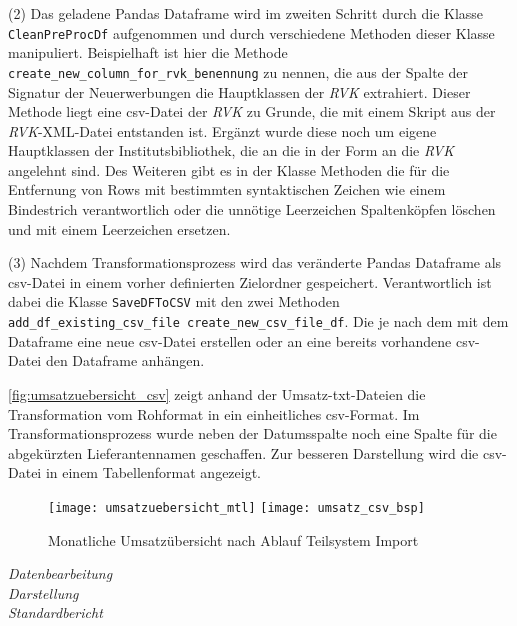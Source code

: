     (2) Das geladene Pandas Dataframe wird im zweiten Schritt durch die Klasse \texttt{CleanPreProcDf} aufgenommen und durch verschiedene Methoden dieser Klasse
    manipuliert. Beispielhaft ist hier die Methode \texttt{create\_new\_column\_for\_rvk\_benennung} zu nennen, die aus der Spalte der Signatur 
    der Neuerwerbungen die Hauptklassen der \textit{\acrlong{RVK}} extrahiert. Dieser Methode liegt eine csv-Datei
    der \textit{\acrshort{RVK}} zu Grunde, die mit einem Skript aus der \textit{\acrshort{RVK}}-XML-Datei entstanden ist. Ergänzt wurde diese noch um eigene Hauptklassen 
    der Institutsbibliothek, die an die in der Form an die \textit{\acrshort{RVK}} angelehnt sind. Des Weiteren gibt es in der Klasse Methoden die für die Entfernung von Rows
    mit bestimmten syntaktischen Zeichen wie einem Bindestrich verantwortlich oder die unnötige Leerzeichen Spaltenköpfen löschen und mit einem Leerzeichen ersetzen.
     
    (3) Nachdem Transformationsprozess wird das veränderte Pandas Dataframe als csv-Datei in einem vorher definierten Zielordner gespeichert. 
    Verantwortlich ist dabei die Klasse \texttt{SaveDFToCSV} mit den zwei Methoden \texttt{add\_df\_existing\_csv\_file create\_new\_csv\_file\_df}. 
    Die je nach dem mit dem Dataframe eine neue csv-Datei erstellen oder an eine bereits vorhandene csv-Datei den Dataframe anhängen.
    
    \autoref{fig:umsatzuebersicht_csv} zeigt anhand der Umsatz-txt-Dateien die Transformation vom Rohformat in ein einheitliches csv-Format. 
    Im Transformationsprozess wurde neben der Datumsspalte noch eine Spalte für die abgekürzten Lieferantennamen geschaffen. Zur besseren Darstellung
    wird die csv-Datei in einem Tabellenformat angezeigt.

    \begin{figure}[h]
        \centering
            \texttt{[image: umsatzuebersicht\_mtl]}
            \texttt{[image: umsatz\_csv\_bsp]}
            \caption{Monatliche Umsatzübersicht nach Ablauf Teilsystem Import}
            \label{fig:umsatzuebersicht_csv}
    \end{figure}
    

    
    \textit{Datenbearbeitung}\\
    \textit{Darstellung}\\
    \textit{Standardbericht}\\
    
